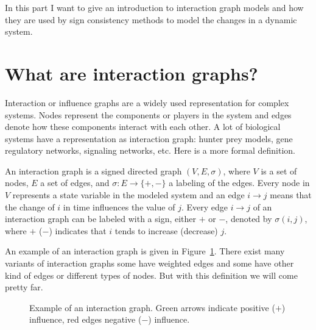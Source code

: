 
In this part I want to give an introduction to interaction graph models and how they are
used by sign consistency methods to model the changes in a dynamic system.

\section*{What are interaction graphs?}

Interaction or influence graphs are a widely used representation for complex systems.
Nodes represent the components or players in the system and edges denote how these components interact with each other.
A lot of biological systems have a representation as interaction graph: 
 hunter prey models, gene regulatory networks, signaling networks,  etc. 
Here is a more formal definition.
\begin{definition}
An interaction graph is a signed directed graph $(V, E, \sigma)$,
 where $V$ is a set of nodes, $E$ a set of edges, and $\sigma : E \rightarrow \{ \plus, \minus \}$ a labeling of the edges. 
Every node in $V$ represents a state variable in the modeled system and 
an edge $i \rightarrow j$ means that the change of $i$ in time influences the value of $j$. 
Every edge $i \rightarrow j$ of an interaction graph can be labeled with a sign,
 either $\plus$ or $\minus$, denoted by $\sigma(i, j)$,
 where $\plus$ ($\minus$) indicates that $i$ tends to increase (decrease) $j$.
\end{definition}
An example of an interaction graph is given in Figure~\ref{fig:ig}. 
There exist many variants of interaction graphs some have weighted edges and 
some have other kind of edges or different types of nodes. 
But with this definition we will come pretty far.
\begin{figure}
  \centering
  \caption{Example of an interaction graph. Green arrows indicate positive ($\plus$) influence,
    red edges negative ($\minus$) influence.
  }
  \label{fig:ig}
\end{figure}


